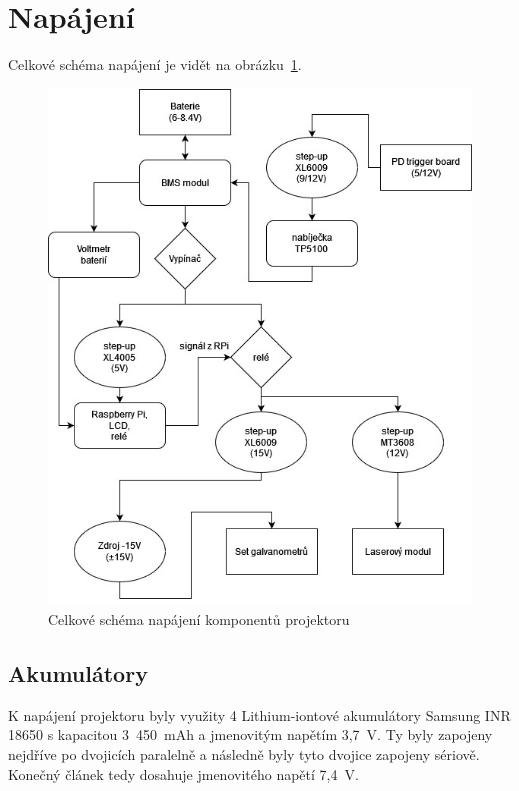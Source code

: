 \section{Napájení}
Celkové schéma napájení je vidět na obrázku~\ref{fig:power-schem-full}.

\begin{figure}[!h]
  \centering
  \includegraphics[width=\textwidth]{img/power-schem-full.jpg}
  \caption{\label{fig:power-schem-full} Celkové schéma napájení komponentů projektoru}
\end{figure}

\subsection{Akumulátory}
K napájení projektoru byly využity 4 Lithium-iontové akumulátory Samsung INR 18650 s kapacitou 3~450~mAh a jmenovitým napětím 3,7~V. Ty byly zapojeny nejdříve po dvojicích paralelně a následně byly tyto dvojice zapojeny sériově. Konečný článek tedy dosahuje jmenovitého napětí 7,4~V.

